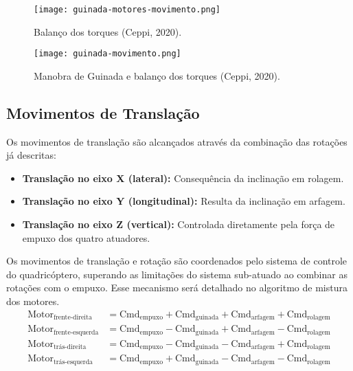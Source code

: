 \begin{figure}[H]
	\centering
	\texttt{[image: guinada-motores-movimento.png]}
	\caption{Balanço dos torques (Ceppi, 2020).}
	\label{fig:yaw_torques}
\end{figure}


\begin{figure}[H]
	\centering
	\texttt{[image: guinada-movimento.png]} %
	\caption{Manobra de Guinada e balanço dos torques (Ceppi, 2020).}
	\label{fig:yaw_maneuver_torques}
\end{figure}


\subsection{Movimentos de Translação}
Os movimentos de translação são alcançados através da combinação das rotações já descritas:

\begin{itemize}
	\item \textbf{Translação no eixo X (lateral):} Consequência da inclinação em rolagem.
	\item \textbf{Translação no eixo Y (longitudinal):} Resulta da inclinação em arfagem.
	\item \textbf{Translação no eixo Z (vertical):} Controlada diretamente pela força de empuxo dos quatro atuadores.
\end{itemize}

Os movimentos de translação e rotação são coordenados pelo sistema de controle do quadricóptero, superando as limitações do sistema sub-atuado ao combinar as rotações com o empuxo. Esse mecanismo será detalhado no algoritmo de mistura dos motores.
\begin{align}
	\text{Motor}_{\text{frente-direita}} &= \text{Cmd}_{\text{empuxo}} + \text{Cmd}_{\text{guinada}} + \text{Cmd}_{\text{arfagem}} + \text{Cmd}_{\text{rolagem}} \\
	\text{Motor}_{\text{frente-esquerda}} &= \text{Cmd}_{\text{empuxo}} - \text{Cmd}_{\text{guinada}} + \text{Cmd}_{\text{arfagem}} - \text{Cmd}_{\text{rolagem}} \\
	\text{Motor}_{\text{trás-direita}} &= \text{Cmd}_{\text{empuxo}} - \text{Cmd}_{\text{guinada}} - \text{Cmd}_{\text{arfagem}} + \text{Cmd}_{\text{rolagem}} \\
	\text{Motor}_{\text{trás-esquerda}} &= \text{Cmd}_{\text{empuxo}} + \text{Cmd}_{\text{guinada}} - \text{Cmd}_{\text{arfagem}} - \text{Cmd}_{\text{rolagem}}
\end{align}

